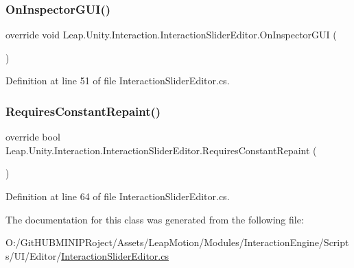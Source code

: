 \subsubsection{\texorpdfstring{OnInspectorGUI()}{OnInspectorGUI()}}
{\footnotesize\ttfamily override void Leap.\+Unity.\+Interaction.\+Interaction\+Slider\+Editor.\+On\+Inspector\+G\+UI (\begin{DoxyParamCaption}{ }\end{DoxyParamCaption})}



Definition at line 51 of file Interaction\+Slider\+Editor.\+cs.

\mbox{\label{class_leap_1_1_unity_1_1_interaction_1_1_interaction_slider_editor_a8f97738759c3027bfa79206c53496a84}} 
\subsubsection{\texorpdfstring{RequiresConstantRepaint()}{RequiresConstantRepaint()}}
{\footnotesize\ttfamily override bool Leap.\+Unity.\+Interaction.\+Interaction\+Slider\+Editor.\+Requires\+Constant\+Repaint (\begin{DoxyParamCaption}{ }\end{DoxyParamCaption})}



Definition at line 64 of file Interaction\+Slider\+Editor.\+cs.



The documentation for this class was generated from the following file\+:\begin{DoxyCompactItemize}
\item 
O\+:/\+Git\+H\+U\+B\+M\+I\+N\+I\+P\+Roject/\+Assets/\+Leap\+Motion/\+Modules/\+Interaction\+Engine/\+Scripts/\+U\+I/\+Editor/\mbox{\hyperlink{_interaction_slider_editor_8cs}{Interaction\+Slider\+Editor.\+cs}}\end{DoxyCompactItemize}
